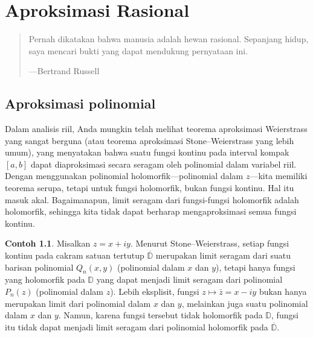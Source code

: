 \documentclass[12pt,openany]{book}
\newcommand{\D}{{\mathbb{D}}}
\theoremstyle{plain}
\theoremstyle{remark}
\theoremstyle{definition}
\newenvironment{myepigraph}{%
    \begin{quote}%
    \begingroup\itshape
}{%
    \endgroup%
    \end{quote}
}
\theoremstyle{exercise}
\theoremstyle{example}
\newtheorem{example}[thm]{Contoh}
\begin{document}

\chapter{Aproksimasi Rasional} \label{ch:runge}

\begin{myepigraph}
Pernah dikatakan bahwa manusia adalah hewan rasional. Sepanjang hidup, saya mencari bukti yang dapat mendukung pernyataan ini.

---Bertrand Russell
\end{myepigraph}



\section{Aproksimasi polinomial}
\label{sec:polyapprox}

Dalam analisis riil, Anda mungkin telah melihat
teorema aproksimasi Weierstrass yang sangat berguna (atau teorema aproksimasi
Stone--Weierstrass yang lebih umum), yang menyatakan bahwa suatu fungsi kontinu
pada interval kompak $[a,b]$ dapat diaproksimasi secara seragam oleh polinomial
dalam variabel riil.  Dengan menggunakan polinomial holomorfik---polinomial dalam $z$---kita memiliki
teorema serupa, tetapi untuk fungsi holomorfik, bukan
fungsi kontinu.  Hal itu masuk akal.  Bagaimanapun, limit seragam dari
fungsi-fungsi holomorfik adalah holomorfik, sehingga kita tidak dapat berharap mengaproksimasi semua
fungsi kontinu.

\begin{example}
Misalkan $z = x+iy$.
Menurut Stone--Weierstrass,
setiap fungsi kontinu pada cakram satuan tertutup $\overline{\D}$
merupakan limit seragam dari suatu barisan polinomial
$Q_n(x,y)$ (polinomial dalam $x$ dan $y$), tetapi hanya fungsi yang
holomorfik pada $\D$ yang dapat menjadi limit seragam dari polinomial
$P_n(z)$ (polinomial dalam $z$).
Lebih eksplisit, fungsi $z \mapsto \bar{z}=x-iy$ bukan hanya merupakan limit dari
polinomial dalam $x$ dan $y$, melainkan juga suatu polinomial dalam $x$ dan $y$.  Namun, karena
fungsi tersebut tidak holomorfik pada $\D$, fungsi itu tidak dapat menjadi
limit seragam dari polinomial holomorfik pada $\overline{\D}$.
\end{example}
\end{document}
